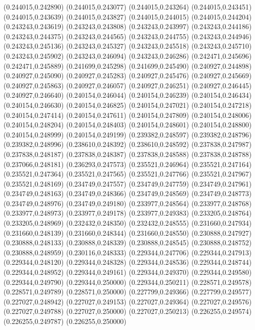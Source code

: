 (0.244015,0.242890)
(0.244015,0.243077)
(0.244015,0.243264)
(0.244015,0.243451)
(0.244015,0.243639)
(0.244015,0.243827)
(0.244015,0.244015)
(0.244015,0.244204)
(0.243243,0.243619)
(0.243243,0.243808)
(0.243243,0.243997)
(0.243243,0.244186)
(0.243243,0.244375)
(0.243243,0.244565)
(0.243243,0.244755)
(0.243243,0.244946)
(0.243243,0.245136)
(0.243243,0.245327)
(0.243243,0.245518)
(0.243243,0.245710)
(0.243243,0.245902)
(0.243243,0.246094)
(0.243243,0.246286)
(0.242471,0.245696)
(0.242471,0.245889)
(0.241699,0.245298)
(0.241699,0.245490)
(0.240927,0.244898)
(0.240927,0.245090)
(0.240927,0.245283)
(0.240927,0.245476)
(0.240927,0.245669)
(0.240927,0.245863)
(0.240927,0.246057)
(0.240927,0.246251)
(0.240927,0.246445)
(0.240927,0.246640)
(0.240154,0.246044)
(0.240154,0.246239)
(0.240154,0.246434)
(0.240154,0.246630)
(0.240154,0.246825)
(0.240154,0.247021)
(0.240154,0.247218)
(0.240154,0.247414)
(0.240154,0.247611)
(0.240154,0.247809)
(0.240154,0.248006)
(0.240154,0.248204)
(0.240154,0.248403)
(0.240154,0.248601)
(0.240154,0.248800)
(0.240154,0.248999)
(0.240154,0.249199)
(0.239382,0.248597)
(0.239382,0.248796)
(0.239382,0.248996)
(0.238610,0.248392)
(0.238610,0.248592)
(0.237838,0.247987)
(0.237838,0.248187)
(0.237838,0.248387)
(0.237838,0.248588)
(0.237838,0.248788)
(0.237066,0.248181)
(0.236293,0.247573)
(0.235521,0.246964)
(0.235521,0.247164)
(0.235521,0.247364)
(0.235521,0.247565)
(0.235521,0.247766)
(0.235521,0.247967)
(0.235521,0.248169)
(0.234749,0.247557)
(0.234749,0.247759)
(0.234749,0.247961)
(0.234749,0.248163)
(0.234749,0.248366)
(0.234749,0.248569)
(0.234749,0.248773)
(0.234749,0.248976)
(0.234749,0.249180)
(0.233977,0.248564)
(0.233977,0.248768)
(0.233977,0.248973)
(0.233977,0.249178)
(0.233977,0.249383)
(0.233205,0.248764)
(0.233205,0.248969)
(0.232432,0.248350)
(0.232432,0.248555)
(0.231660,0.247934)
(0.231660,0.248139)
(0.231660,0.248344)
(0.231660,0.248550)
(0.230888,0.247927)
(0.230888,0.248133)
(0.230888,0.248339)
(0.230888,0.248545)
(0.230888,0.248752)
(0.230888,0.248959)
(0.230116,0.248333)
(0.229344,0.247706)
(0.229344,0.247913)
(0.229344,0.248120)
(0.229344,0.248328)
(0.229344,0.248536)
(0.229344,0.248744)
(0.229344,0.248952)
(0.229344,0.249161)
(0.229344,0.249370)
(0.229344,0.249580)
(0.229344,0.249790)
(0.229344,0.250000)
(0.229344,0.250211)
(0.228571,0.249578)
(0.228571,0.249789)
(0.228571,0.250000)
(0.227799,0.249366)
(0.227799,0.249577)
(0.227027,0.248942)
(0.227027,0.249153)
(0.227027,0.249364)
(0.227027,0.249576)
(0.227027,0.249788)
(0.227027,0.250000)
(0.227027,0.250213)
(0.226255,0.249574)
(0.226255,0.249787)
(0.226255,0.250000)
